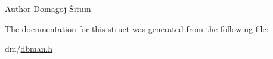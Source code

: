 \begin{DoxyAuthor}{Author}
Domagoj Šitum 
\end{DoxyAuthor}


The documentation for this struct was generated from the following file\+:\begin{DoxyCompactItemize}
\item 
dm/\hyperlink{dbman_8h}{dbman.\+h}\end{DoxyCompactItemize}
